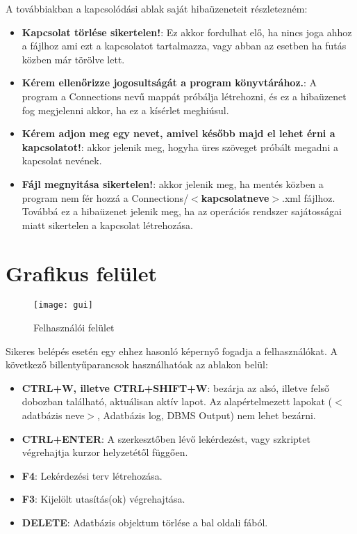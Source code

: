 A továbbiakban a kapcsolódási ablak saját hibaüzeneteit részletezném:
\begin{itemize}
  \item \textbf{Kapcsolat törlése sikertelen!}: Ez akkor fordulhat elő, ha nincs joga ahhoz a fájlhoz ami
  ezt a kapcsolatot tartalmazza, vagy abban az esetben ha futás közben már törölve lett.
  \item \textbf{Kérem ellenőrizze jogosultságát a program könyvtárához.}: A program a Connections nevű mappát
  próbálja létrehozni, és ez a hibaüzenet fog megjelenni akkor, ha ez a kísérlet meghiúsul.
  \item \textbf{Kérem adjon meg egy nevet, amivel később majd el lehet érni a kapcsolatot!}: akkor jelenik meg, hogyha üres
  szöveget próbált megadni a kapcsolat nevének.
  \item \textbf{Fájl megnyitása sikertelen!}: akkor jelenik meg, ha mentés közben a program nem fér hozzá a
  Connections/\textbf{$<$kapcsolatneve$>$}.xml fájlhoz. Továbbá ez a hibaüzenet jelenik meg, ha az operációs rendszer sajátosságai miatt
  sikertelen a kapcsolat létrehozása.
\end{itemize}

\newpage

\section{Grafikus felület}
\begin{figure}[ht]
    \texttt{[image: gui]}
 \caption{Felhasználói felület}
\end{figure}
Sikeres belépés esetén egy ehhez hasonló képernyő fogadja a felhasználókat.
A következő billentyűparancsok használhatóak az ablakon belül:
\begin{itemize}
  \item \textbf{CTRL+W, illetve CTRL+SHIFT+W}: bezárja az alsó, illetve felső dobozban található, aktuálisan aktív lapot. Az alapértelmezett lapokat ($<$adatbázis neve$>$, Adatbázis log, DBMS Output) nem lehet bezárni.
  \item \textbf{CTRL+ENTER}: A szerkesztőben lévő lekérdezést, vagy szkriptet végrehajtja kurzor helyzetétől függően.
  \item \textbf{F4}: Lekérdezési terv létrehozása.
  \item \textbf{F3}: Kijelölt utasítás(ok) végrehajtása.
  \item \textbf{DELETE}: Adatbázis objektum törlése a bal oldali fából.
\end{itemize}

